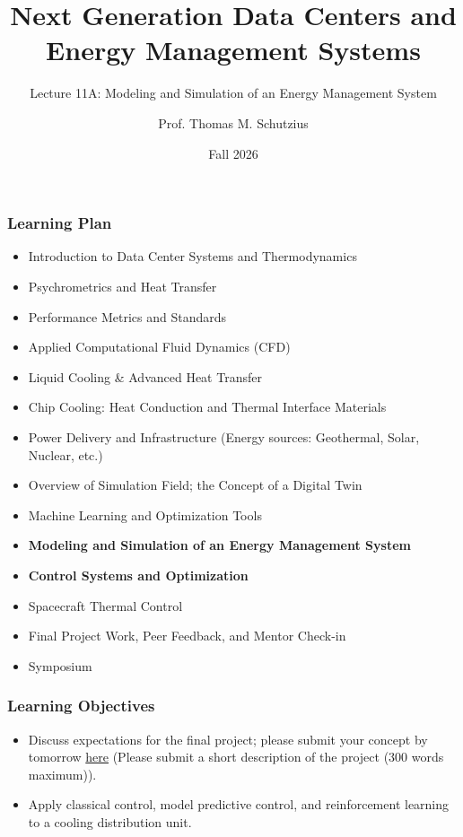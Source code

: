 \documentclass[aspectratio=169,10pt,xcolor={table,dvipsnames},t]{beamer}
\title[lecture 11]{Next Generation Data Centers and Energy Management Systems}
\subtitle{Lecture 11A: Modeling and Simulation of an Energy Management System}
\author{Prof. Thomas M. Schutzius}
\institute{Department of Mechanical Engineering}
\date{Fall 2026}
\begin{document}
\begin{frame}
  \titlepage
\end{frame}


{
\smallframetitle %

\begin{frame}
	\frametitle{Learning Plan}
	\begin{itemize}
		\item Introduction to Data Center Systems and Thermodynamics 
		\item Psychrometrics and Heat Transfer
		\item Performance Metrics and Standards
		\item Applied Computational Fluid Dynamics (CFD)
		\item Liquid Cooling \& Advanced Heat Transfer
		\item Chip Cooling: Heat Conduction and Thermal Interface Materials
		\item Power Delivery and Infrastructure (Energy sources: Geothermal, Solar, Nuclear, etc.)
		\item Overview of Simulation Field; the Concept of a Digital Twin
		\item Machine Learning and Optimization Tools
		\item \textbf{Modeling and Simulation of an Energy Management System}
		\item \textbf{Control Systems and Optimization}
		\item Spacecraft Thermal Control
		\item Final Project Work, Peer Feedback, and Mentor Check-in 
		\item Symposium 
	\end{itemize}		
\end{frame}

\begin{frame}
	\frametitle{Learning Objectives} 
		\begin{itemize}
    			\item Discuss expectations for the final project; please submit your concept by tomorrow \href{https://docs.google.com/forms/d/e/1FAIpQLSe5BTw9aklbKsupg1H9OMqRFWO3xh66MXXd7bcoMu1ZQBvNaA/viewform?usp=header}{here} (Please submit a short description of the project  (300 words maximum)).
			\item Apply classical control, model predictive control, and reinforcement learning to a cooling distribution unit.
		\end{itemize}		
\end{frame}


}
\end{document}
